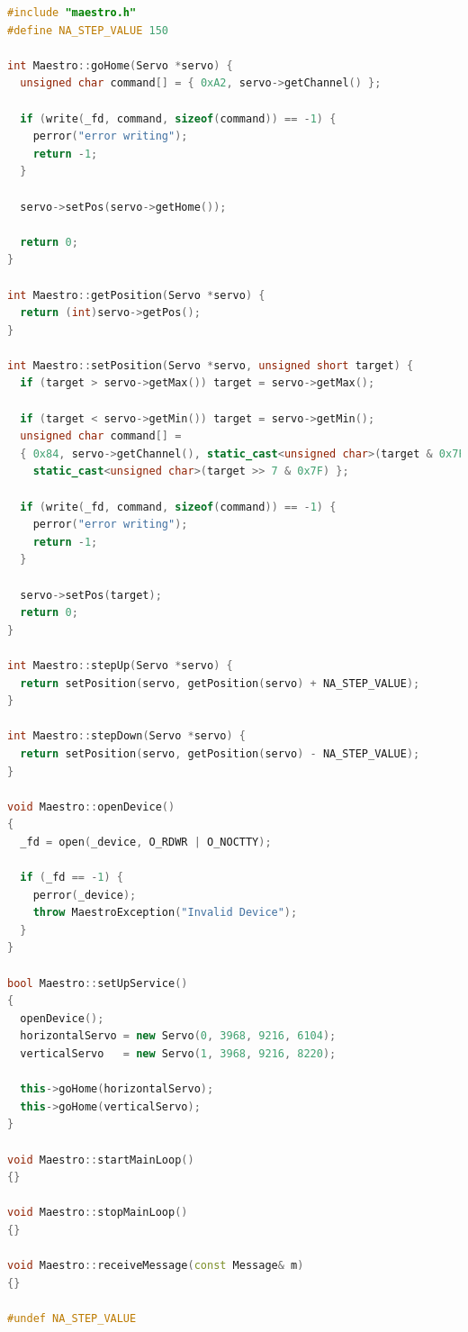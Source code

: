 \documentclass[11pt,a4paper,titlepage]{report}
\begin{document}
\begin{lstlisting}[caption=maestro.cpp,language=C++]
#include "maestro.h"
#define NA_STEP_VALUE 150

int Maestro::goHome(Servo *servo) {
  unsigned char command[] = { 0xA2, servo->getChannel() };

  if (write(_fd, command, sizeof(command)) == -1) {
    perror("error writing");
    return -1;
  }

  servo->setPos(servo->getHome());

  return 0;
}

int Maestro::getPosition(Servo *servo) {
  return (int)servo->getPos();
}

int Maestro::setPosition(Servo *servo, unsigned short target) {
  if (target > servo->getMax()) target = servo->getMax();

  if (target < servo->getMin()) target = servo->getMin();
  unsigned char command[] =
  { 0x84, servo->getChannel(), static_cast<unsigned char>(target & 0x7F),
    static_cast<unsigned char>(target >> 7 & 0x7F) };

  if (write(_fd, command, sizeof(command)) == -1) {
    perror("error writing");
    return -1;
  }

  servo->setPos(target);
  return 0;
}

int Maestro::stepUp(Servo *servo) {
  return setPosition(servo, getPosition(servo) + NA_STEP_VALUE);
}

int Maestro::stepDown(Servo *servo) {
  return setPosition(servo, getPosition(servo) - NA_STEP_VALUE);
}

void Maestro::openDevice()
{
  _fd = open(_device, O_RDWR | O_NOCTTY);

  if (_fd == -1) {
    perror(_device);
    throw MaestroException("Invalid Device");
  }
}

bool Maestro::setUpService()
{
  openDevice();
  horizontalServo = new Servo(0, 3968, 9216, 6104);
  verticalServo   = new Servo(1, 3968, 9216, 8220);

  this->goHome(horizontalServo);
  this->goHome(verticalServo);
}

void Maestro::startMainLoop()
{}

void Maestro::stopMainLoop()
{}

void Maestro::receiveMessage(const Message& m)
{}

#undef NA_STEP_VALUE
\end{lstlisting}
\end{document}
